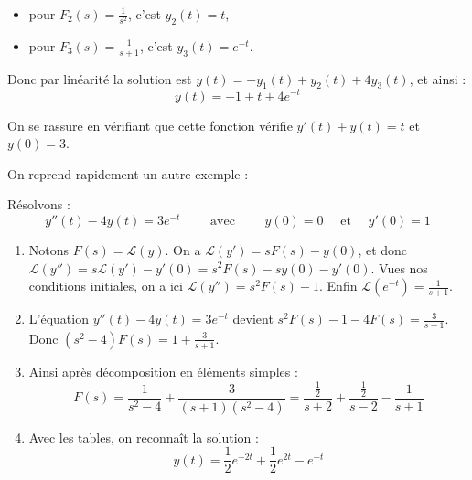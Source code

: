 \documentclass[class=report,crop=false]{standalone}
\begin{document}
\begin{exemple}
\begin{enumerate}
\begin{itemize}
    \item pour $F_2(s) = \frac{1}{s^2}$, c'est $y_2(t) = t$,
    
    \item pour $F_3(s) = \frac{1}{s+1}$, c'est $y_3(t) = e^{-t}$.
  \end{itemize}
  
  Donc par linéarité la solution est $y(t) = -y_1(t)+y_2(t)+4y_3(t)$,
  et ainsi :
  $$y(t) = -1 + t + 4e^{-t}$$
  
  On se rassure en vérifiant que cette fonction vérifie 
  $y'(t) + y(t) = t$ et $y(0) = 3$.  
  \end{enumerate}
\end{exemple}

On reprend rapidement un autre exemple :
\begin{exemple}
Résolvons :
$$y''(t) - 4y(t) = 3e^{-t} \qquad \text{ avec }\qquad y(0) = 0 \quad \text{ et } \quad y'(0) = 1$$

\begin{enumerate}
  \item Notons $F(s) = \mathcal{L}(y)$. On a $\mathcal{L}(y') = sF(s)-y(0)$,
  et donc $\mathcal{L}(y'') = s\mathcal{L}(y')-y'(0) = s^2F(s)-sy(0)-y'(0)$.
  Vues nos conditions initiales, on a ici $\mathcal{L}(y'') 
  = s^2F(s)-1$.
  Enfin $\mathcal{L}(e^{-t}) = \frac{1}{s+1}$.
  
  \item L'équation $y''(t) - 4y(t) = 3e^{-t}$ devient
  $s^2F(s)-1-4F(s) = \frac{3}{s+1}$.
  Donc $(s^2-4)F(s) = 1 +\frac{3}{s+1}$.
  
  \item Ainsi après décomposition en éléments simples :
  $$F(s) = \frac{1}{s^2-4} + \frac{3}{(s+1)(s^2-4)}
  = \frac{\frac12}{s+2} + \frac{\frac12}{s-2} - \frac{1}{s+1}$$
  
  \item Avec les tables, on reconnaît la solution : 
  $$y(t) = \frac12 e^{-2t} + \frac12 e^{2t} - e^{-t}$$
  \end{enumerate}
\end{exemple}


\end{document}
